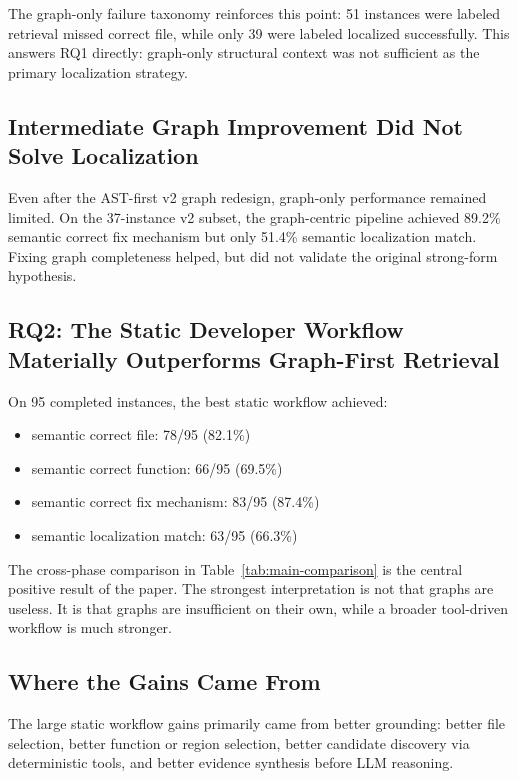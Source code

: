 \documentclass[11pt]{article}
\begin{document}
The graph-only failure taxonomy reinforces this point: 51 instances were labeled retrieval missed correct file, while only 39 were labeled localized successfully. This answers RQ1 directly: graph-only structural context was not sufficient as the primary localization strategy.

\subsection{Intermediate Graph Improvement Did Not Solve Localization}

Even after the AST-first v2 graph redesign, graph-only performance remained limited. On the 37-instance v2 subset, the graph-centric pipeline achieved 89.2\% semantic correct fix mechanism but only 51.4\% semantic localization match. Fixing graph completeness helped, but did not validate the original strong-form hypothesis.

\subsection{RQ2: The Static Developer Workflow Materially Outperforms Graph-First Retrieval}

On 95 completed instances, the best static workflow achieved:

\begin{itemize}
\item semantic correct file: 78/95 (82.1\%)
\item semantic correct function: 66/95 (69.5\%)
\item semantic correct fix mechanism: 83/95 (87.4\%)
\item semantic localization match: 63/95 (66.3\%)
\end{itemize}

The cross-phase comparison in Table~\ref{tab:main-comparison} is the central positive result of the paper. The strongest interpretation is not that graphs are useless. It is that graphs are insufficient on their own, while a broader tool-driven workflow is much stronger.

\subsection{Where the Gains Came From}

The large static workflow gains primarily came from better grounding: better file selection, better function or region selection, better candidate discovery via deterministic tools, and better evidence synthesis before LLM reasoning.
\end{document}

